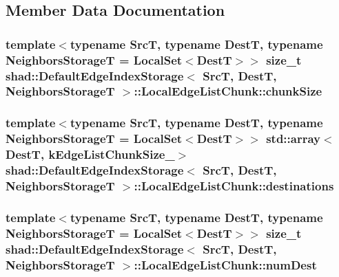 \subsection{Member Data Documentation}
\hypertarget{structshad_1_1DefaultEdgeIndexStorage_1_1LocalEdgeListChunk_a6d82addc7d5c342822104d750afec0c9}{
\subsubsection[{chunk\-Size}]{\setlength{\rightskip}{0pt plus 5cm}template$<$typename Src\-T, typename Dest\-T, typename Neighbors\-Storage\-T = Local\-Set$<$\-Dest\-T$>$$>$ size\-\_\-t {\bf shad\-::\-Default\-Edge\-Index\-Storage}$<$ Src\-T, Dest\-T, Neighbors\-Storage\-T $>$\-::Local\-Edge\-List\-Chunk\-::chunk\-Size}}\label{structshad_1_1DefaultEdgeIndexStorage_1_1LocalEdgeListChunk_a6d82addc7d5c342822104d750afec0c9}
\hypertarget{structshad_1_1DefaultEdgeIndexStorage_1_1LocalEdgeListChunk_adc9b9bf8d3bd6c3adb394737e3038907}{
\subsubsection[{destinations}]{\setlength{\rightskip}{0pt plus 5cm}template$<$typename Src\-T, typename Dest\-T, typename Neighbors\-Storage\-T = Local\-Set$<$\-Dest\-T$>$$>$ std\-::array$<$Dest\-T, {\bf k\-Edge\-List\-Chunk\-Size\-\_\-}$>$ {\bf shad\-::\-Default\-Edge\-Index\-Storage}$<$ Src\-T, Dest\-T, Neighbors\-Storage\-T $>$\-::Local\-Edge\-List\-Chunk\-::destinations}}\label{structshad_1_1DefaultEdgeIndexStorage_1_1LocalEdgeListChunk_adc9b9bf8d3bd6c3adb394737e3038907}
\hypertarget{structshad_1_1DefaultEdgeIndexStorage_1_1LocalEdgeListChunk_a3091dc3831cae7d0dcc7ab1b53141225}{
\subsubsection[{num\-Dest}]{\setlength{\rightskip}{0pt plus 5cm}template$<$typename Src\-T, typename Dest\-T, typename Neighbors\-Storage\-T = Local\-Set$<$\-Dest\-T$>$$>$ size\-\_\-t {\bf shad\-::\-Default\-Edge\-Index\-Storage}$<$ Src\-T, Dest\-T, Neighbors\-Storage\-T $>$\-::Local\-Edge\-List\-Chunk\-::num\-Dest}}\label{structshad_1_1DefaultEdgeIndexStorage_1_1LocalEdgeListChunk_a3091dc3831cae7d0dcc7ab1b53141225}
